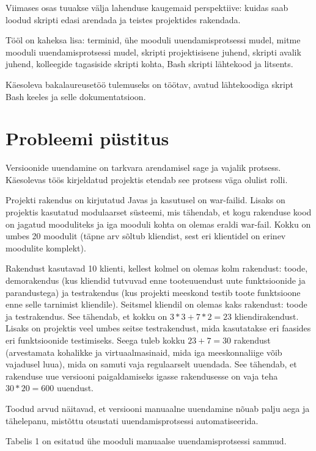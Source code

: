 \documentclass[12pt]{article}
\begin{document}
  Viimases osas tuuakse välja lahenduse kaugemaid perspektiive: kuidas saab loodud skripti edasi arendada ja teistes projektides rakendada.
  
  Tööl on kaheksa lisa: terminid, ühe mooduli uuendamisprotsessi mudel, mitme mooduli uuendamisprotsessi mudel, skripti projektisisene juhend, skripti avalik juhend, kolleegide tagasiside skripti kohta, Bash skripti lähtekood ja litsents.
  
  Käesoleva bakalaureusetöö tulemuseks on töötav, avatud lähtekoodiga skript Bash keeles ja selle dokumentatsioon.
  
  \newpage
  
  \section{Probleemi püstitus}
  
  Versioonide uuendamine on tarkvara arendamisel sage ja vajalik protsess. Käes\-olevas töös kirjeldatud projektis etendab see protsess väga olulist rolli.
  
  Projekti rakendus on kirjutatud Javas ja kasutusel on war\--failid. Lisaks on projektis kasutatud modulaarset süsteemi, mis tähendab, et kogu rakenduse kood on jagatud mooduliteks ja iga mooduli kohta on olemas eraldi war\--fail. Kokku on umbes 20 moodulit (täpne arv sõltub kliendist, sest eri klientidel on erinev moodulite komplekt).
  
  Rakendust kasutavad 10 klienti, kellest kolmel on olemas kolm rakendust: toode, demorakendus (kus kliendid tutvuvad enne tooteuuendust uute funktsioonide ja parandustega) ja testrakendus (kus projekti meeskond testib toote funktsioone enne selle tarnimist kliendile). Seitsmel kliendil on olemas kaks rakendust: toode ja testrakendus. See tähendab, et kokku on $3*3+7*2=23$ kliendirakendust. Lisaks on projektis veel umbes seitse testrakendust, mida kasutatakse eri faasides eri funktsioonide testimiseks. Seega tuleb kokku $23+7=30$ rakendust (arvestamata kohalikke ja virtuaalmasinaid, mida iga meeskonnaliige võib vajadusel luua), mida on samuti vaja regulaarselt uuendada. See tähendab, et rakenduse uue versiooni paigaldamiseks igasse rakendusesse on vaja teha $30*20=600$ uuendust.
  
  Toodud arvud näitavad, et versiooni manuaalne uuendamine nõuab palju aega ja tähelepanu, mistõttu otsustati uuendamisprotsessi automatiseerida.
    
  Tabelis 1 on esitatud ühe mooduli manuaalse uuendamisprotsessi sammud.
  
\end{document}
